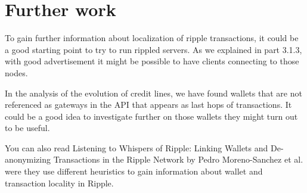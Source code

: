 \section{Further work}
To gain further information about localization of ripple transactions, it could be a good starting point to try to run rippled servers. As we explained in part 3.1.3, with good advertisement it might be possible to have clients connecting to those nodes.

In the analysis of the evolution of credit lines, we have found wallets that are not referenced as gateways in the API that appears as last hops of transactions. It could be a good idea to investigate further on those wallets they might turn out to be useful.

You can also read Listening to Whispers of Ripple: Linking Wallets and De-anonymizing Transactions in the Ripple Network by Pedro Moreno-Sanchez et al.\cite{ListeningtoWhispersofRipple} were they use different heuristics to gain information about wallet and transaction locality in Ripple.
